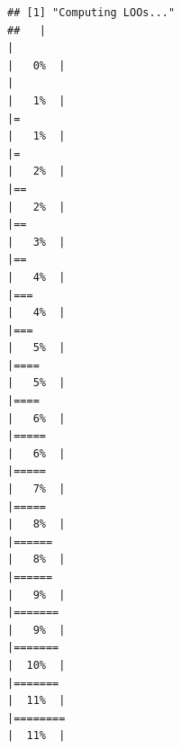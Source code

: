 \documentclass[
]{article}
\begin{document}
\begin{verbatim}
## [1] "Computing LOOs..."
##   |                                                                              |                                                                      |   0%  |                                                                              |                                                                      |   1%  |                                                                              |=                                                                     |   1%  |                                                                              |=                                                                     |   2%  |                                                                              |==                                                                    |   2%  |                                                                              |==                                                                    |   3%  |                                                                              |==                                                                    |   4%  |                                                                              |===                                                                   |   4%  |                                                                              |===                                                                   |   5%  |                                                                              |====                                                                  |   5%  |                                                                              |====                                                                  |   6%  |                                                                              |=====                                                                 |   6%  |                                                                              |=====                                                                 |   7%  |                                                                              |=====                                                                 |   8%  |                                                                              |======                                                                |   8%  |                                                                              |======                                                                |   9%  |                                                                              |=======                                                               |   9%  |                                                                              |=======                                                               |  10%  |                                                                              |=======                                                               |  11%  |                                                                              |========                                                              |  11%  |                                                              
\end{verbatim}
\end{document}
